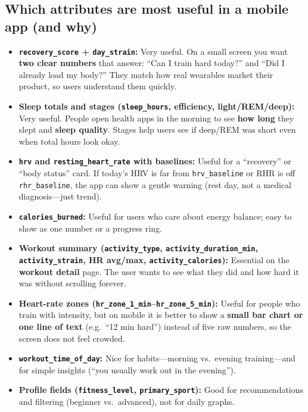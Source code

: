 \documentclass[11pt,a4paper]{article}
\begin{document}
\subsection{Which attributes are most useful in a mobile app (and why)}
\begin{itemize}[leftmargin=*]
  \item \textbf{\texttt{recovery\_score} + \texttt{day\_strain}:} Very useful. On a small screen you want \textbf{two clear numbers} that answer: ``Can I train hard today?'' and ``Did I already load my body?'' They match how real wearables market their product, so users understand them quickly.
  \item \textbf{Sleep totals and stages (\texttt{sleep\_hours}, efficiency, light/REM/deep):} Very useful. People open health apps in the morning to see \textbf{how long} they slept and \textbf{sleep quality}. Stages help users see if deep/REM was short even when total hours look okay.
  \item \textbf{\texttt{hrv} and \texttt{resting\_heart\_rate} with baselines:} Useful for a ``recovery'' or ``body status'' card. If today's HRV is far from \texttt{hrv\_baseline} or RHR is off \texttt{rhr\_baseline}, the app can show a gentle warning (rest day, not a medical diagnosis---just trend).
  \item \textbf{\texttt{calories\_burned}:} Useful for users who care about energy balance; easy to show as one number or a progress ring.
  \item \textbf{Workout summary (\texttt{activity\_type}, \texttt{activity\_duration\_min}, \texttt{activity\_strain}, HR avg/max, \texttt{activity\_calories}):} Essential on the \textbf{workout detail} page. The user wants to see what they did and how hard it was without scrolling forever.
  \item \textbf{Heart-rate zones (\texttt{hr\_zone\_1\_min}--\texttt{hr\_zone\_5\_min}):} Useful for people who train with intensity, but on mobile it is better to show a \textbf{small bar chart or one line of text} (e.g.\ ``12 min hard'') instead of five raw numbers, so the screen does not feel crowded.
  \item \textbf{\texttt{workout\_time\_of\_day}:} Nice for habits---morning vs.\ evening training---and for simple insights (``you usually work out in the evening'').
  \item \textbf{Profile fields (\texttt{fitness\_level}, \texttt{primary\_sport}):} Good for recommendations and filtering (beginner vs.\ advanced), not for daily graphs.
\end{itemize}
\end{document}
